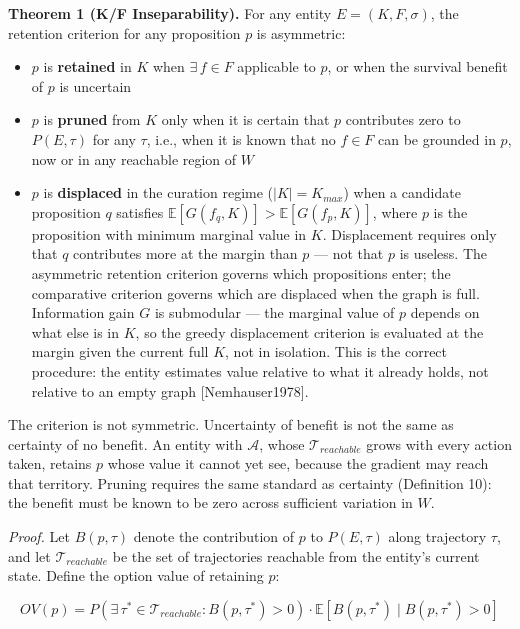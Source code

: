 \documentclass[
]{article}
\providecommand{\tightlist}{%
  \setlength{\itemsep}{0pt}\setlength{\parskip}{0pt}}
\begin{document}
\textbf{Theorem 1 (K/F Inseparability).} For any entity
\(E = (K, F, \sigma)\), the retention criterion for any proposition
\(p\) is asymmetric:

\begin{itemize}
\tightlist
\item
  \(p\) is \textbf{retained} in \(K\) when \(\exists\, f \in F\)
  applicable to \(p\), or when the survival benefit of \(p\) is
  uncertain
\item
  \(p\) is \textbf{pruned} from \(K\) only when it is certain that \(p\)
  contributes zero to \(P(E, \tau)\) for any \(\tau\), i.e., when it is
  known that no \(f \in F\) can be grounded in \(p\), now or in any
  reachable region of \(W\)
\item
  \(p\) is \textbf{displaced} in the curation regime (\(|K| = K_{max}\))
  when a candidate proposition \(q\) satisfies
  \(\mathbb{E}[G(f_q, K)] > \mathbb{E}[G(f_p, K)]\), where \(p\) is the
  proposition with minimum marginal value in \(K\). Displacement
  requires only that \(q\) contributes more at the margin than \(p\) ---
  not that \(p\) is useless. The asymmetric retention criterion governs
  which propositions enter; the comparative criterion governs which are
  displaced when the graph is full. Information gain \(G\) is submodular
  --- the marginal value of \(p\) depends on what else is in \(K\), so
  the greedy displacement criterion is evaluated at the margin given the
  current full \(K\), not in isolation. This is the correct procedure:
  the entity estimates value relative to what it already holds, not
  relative to an empty graph {[}Nemhauser1978{]}.
\end{itemize}

The criterion is not symmetric. Uncertainty of benefit is not the same
as certainty of no benefit. An entity with \(\mathcal{A}\), whose
\(\mathcal{T}_{reachable}\) grows with every action taken, retains \(p\)
whose value it cannot yet see, because the gradient may reach that
territory. Pruning requires the same standard as certainty (Definition
10): the benefit must be known to be zero across sufficient variation in
\(W\).

\emph{Proof.} Let \(B(p, \tau)\) denote the contribution of \(p\) to
\(P(E, \tau)\) along trajectory \(\tau\), and let
\(\mathcal{T}_{reachable}\) be the set of trajectories reachable from
the entity's current state. Define the option value of retaining \(p\):

\[OV(p) = P\!\left(\exists\,\tau^* \in \mathcal{T}_{reachable} : B(p, \tau^*) > 0\right) \cdot \mathbb{E}\!\left[B(p,\tau^*) \mid B(p, \tau^*) > 0\right]\]
\end{document}
